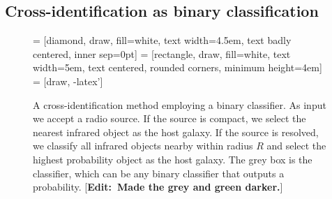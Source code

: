 \documentclass[fleqn,usenatbib,usedcolumn]{mnras}
\newcommand{\edit}[1]{ {\color{red}[{\bf Edit:~{#1}}]} }
\begin{document}
  \subsection{Cross-identification as binary
  classification}\label{cross-identification-as-binary-classification}
    \begin{figure}
      \centering
       = [diamond, draw, fill=white,
          text width=4.5em, text badly centered, inner sep=0pt]
       = [rectangle, draw, fill=white,
          text width=5em, text centered, rounded corners, minimum height=4em]
       = [draw, -latex']
      \caption{A cross-identification method employing a binary classifier. As
        input we accept a radio source. If the source is compact, we select
        the nearest infrared object as the host galaxy. If the source is
        resolved, we classify all infrared objects nearby within radius $R$
        and select the highest probability object as the host galaxy. The grey
        box is the classifier, which can be any binary classifier that outputs
        a probability. \edit{Made the grey and green darker.}}
      \label{fig:flowchart}
    \end{figure}
\end{document}
